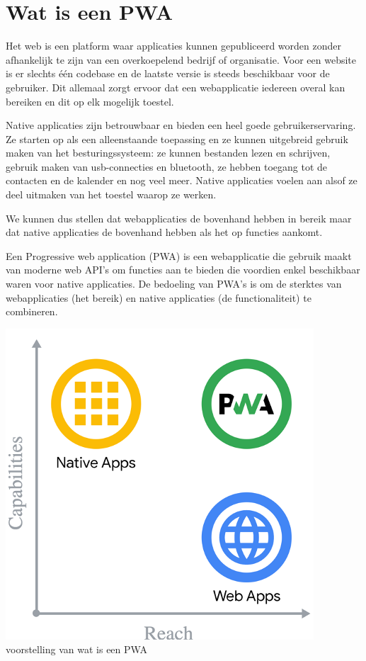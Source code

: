 


\section{Wat is een PWA}


Het web is een platform waar applicaties kunnen gepubliceerd worden zonder afhankelijk te zijn van een overkoepelend bedrijf of organisatie. Voor een website is er slechts één codebase en de laatste versie is steeds beschikbaar voor de gebruiker. 
Dit allemaal zorgt ervoor dat een webapplicatie iedereen overal kan bereiken en dit op elk mogelijk toestel.

Native applicaties zijn betrouwbaar en bieden een heel goede gebruikerservaring. Ze starten op als een alleenstaande toepassing en ze kunnen uitgebreid gebruik maken van het besturingssysteem: ze kunnen bestanden lezen en schrijven, gebruik maken van usb-connecties en bluetooth, ze hebben toegang tot de contacten en de kalender en nog veel meer. Native applicaties voelen aan alsof ze deel uitmaken van het toestel waarop ze werken.

We kunnen dus stellen dat webapplicaties de bovenhand hebben in bereik maar dat native applicaties de bovenhand hebben als het op functies aankomt.

Een Progressive web application (PWA) is een webapplicatie die gebruik maakt van moderne web API’s om functies aan te bieden die voordien enkel beschikbaar waren voor native applicaties. De bedoeling van PWA’s is om de sterktes van webapplicaties (het bereik) en native applicaties (de functionaliteit) te combineren. 


\autocite{Richard2020}
\autocite{Google2020}




\includegraphics{./img/WatIsEenPwa.png}{voorstelling van wat is een PWA \autocite{Richard2020}}



